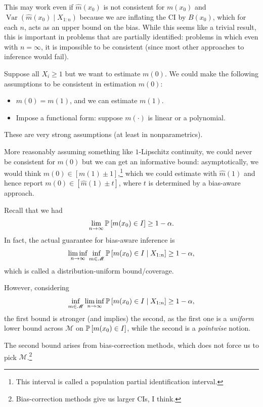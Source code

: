 This may work even if $\hat{m}(x_0)$ is not consistent for $m(x_0)$ and $\operatorname{Var}\left(\hat{m}(x_0)\mid X_{1:n}\right)$ because we are inflating the CI by $B(x_0)$, which for each $n$, acts as an upper bound on the bias.
While this seems like a trivial result, this is important in problems that are partially identified: problems in which even with $n=\infty$, it is impossible to be consistent (since most other approaches to inference would fail).

\begin{example}
	Suppose all $X_i \ge 1$ but we want to estimate $m(0)$.
	We could make the following assumptions to be consistent in estimation $m\left(0 \right)$:
	\begin{itemize}
		\item $m\left( 0 \right) = m(1)$, and we can estimate $m(1)$.
		\item Impose a functional form: suppose $m(\cdot )$ is linear or a polynomial.
	\end{itemize}
	These are very strong assumptions (at least in nonparametrics). 

	More reasonably assuming something like $1$-Lipschitz continuity, we could never be consistent for $m(0)$ but we can get an informative bound: asymptotically, we would think $m(0) \in \left[ m(1) \pm 1 \right]$,\footnote{This interval is called a population partial identification interval.}
	which we could estimate with $\hat{m}(1)$ and hence report $m(0) \in \left[ \hat{m}(1) \pm t \right]$, where $t$ is determined by a bias-aware approach.
\end{example}

\begin{remark}	Recall that we had \[
		\lim\limits_{n \to \infty} \P\left[m(x_0) \in I\right] \ge 1-\alpha
	.\] In fact, the actual guarantee for bias-aware inference is \[
		\liminf\limits_{n \to \infty} \inf_{m \in \mathscr{M}} \P\left[m(x_0) \in I \mid X_{1:n}\right] \ge 1-\alpha
	,\] which is called a distribution-uniform bound/coverage.

	However, considering \[
		\inf_{m \in \mathscr{M}} \liminf\limits_{n \to \infty} \P\left[m(x_0) \in I \mid X_{1:n}\right] \ge 1-\alpha
	,\] 
	the first bound is stronger (and implies) the second, as the first one is a \emph{uniform} lower bound across $\mathscr{M}$ on $\P\left[m(x_0) \in I\right] $, while the second is a \emph{pointwise} notion.

	The second bound arises from bias-correction methods, which does not force us to pick $\mathscr{M}$.\footnote{Bias-correction methods give us larger CIs, I think.}
\end{remark}
